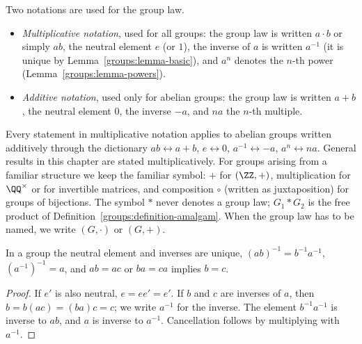 \begin{notation}\label{groups:notation-multiplicative-additive}
Two notations are used for the group law.
\begin{itemize}
\item \emph{Multiplicative notation}, used for all groups: the group law is written
$a \cdot b$ or simply $ab$, the neutral element $e$ (or $1$), the inverse of $a$ is
written $a^{-1}$ (it is unique by Lemma~\ref{groups:lemma-basic}), and $a^n$ denotes
the $n$-th power (Lemma~\ref{groups:lemma-powers}).
\item \emph{Additive notation}, used only for abelian groups: the group law is
written $a + b$, the neutral element $0$, the inverse $-a$, and $na$ the $n$-th
multiple.
\end{itemize}
Every statement in multiplicative notation applies to abelian groups written
additively through the dictionary $ab \leftrightarrow a + b$, $e \leftrightarrow 0$,
$a^{-1} \leftrightarrow -a$, $a^n \leftrightarrow na$. General results in this chapter are
stated multiplicatively. For groups arising from a familiar structure we keep
the familiar symbol: $+$ for $(\ZZ, +)$, multiplication for $\QQ^\times$ or for
invertible matrices, and composition $\circ$ (written as juxtaposition) for groups of
bijections. The symbol $*$ never denotes a group law; $G_1 * G_2$ is the free
product of Definition~\ref{groups:definition-amalgam}. When the group law has to be
named, we write $(G, \cdot)$ or $(G, +)$.
\end{notation}

\begin{lemma}\label{groups:lemma-basic}
In a group the neutral element and inverses are unique, $(ab)^{-1} = b^{-1}a^{-1}$,
$(a^{-1})^{-1} = a$, and $ab = ac$ or $ba = ca$ implies $b = c$.
\end{lemma}

\begin{proof}
If $e'$ is also neutral, $e = ee' = e'$. If $b$ and $c$ are inverses of $a$,
then $b = b(ac) = (ba)c = c$; we write $a^{-1}$ for the inverse. The element
$b^{-1}a^{-1}$ is inverse to $ab$, and $a$ is inverse to $a^{-1}$. Cancellation
follows by multiplying with $a^{-1}$.
\end{proof}

